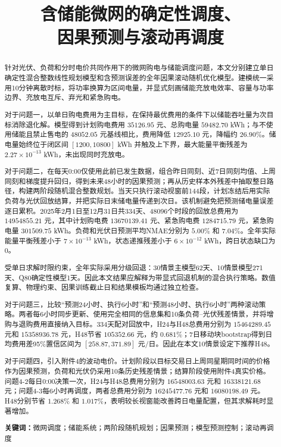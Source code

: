 \documentclass[UTF8,12pt,a4paper]{ctexart}
\title{\textbf{含储能微网的确定性调度、\\因果预测与滚动再调度}}
\author{}
\date{}
\newcommand{\keywords}[1]{\par\noindent\textbf{关键词：}#1}
\begin{document}
\pagestyle{plain}
\setcounter{page}{1}
\maketitle

\begin{abstract}
针对光伏、负荷和分时电价共同作用下的微网购电与储能调度问题，本文分别建立单日确定性混合整数线性规划模型和含预测误差的全年因果滚动随机优化模型。建模统一采用10分钟离散时标，将功率换算为区间电量，并显式刻画储能充放电效率、容量与功率边界、充放电互斥、弃光和紧急购电。

对于问题一，以单日购电费用为主目标，在保持最优费用的条件下以储能吞吐量为次目标消除退化解。模型得到计划购电费用 $35126.95$ 元、总购电量 $59482.70$ kWh；与不使用储能且禁止售电的 $48052.05$ 元基线相比，费用降低 $12925.10$ 元，降幅约 $26.90\%$。储电量始终位于闭区间 $[1200,10800]$ kWh 并触及上下界，最大能量平衡残差为 $2.27\times10^{-13}$ kWh，未出现同时充放电。

对于问题二，在每天0:00仅使用此前已发生数据，组合昨日同刻、近7日同刻均值、上周同刻和梯度提升回归，得到未来48小时的因果预测；再从历史样本外残差中抽取整日路径，构建两阶段随机混合整数规划。当天只执行滚动视窗前144段，计划冻结后用实际负荷与光伏回放结算，并把实际日末储电量传递到次日。该机制避免把预测储电量误差逐日累积。2025年2月1日至12月31日共334天、48096个时段的回放总费用为 $14954855.21$ 元，其中计划购电费 $13670139.41$ 元、紧急购电费 $1284715.79$ 元，紧急购电量 $301509.75$ kWh。负荷和光伏日预测平均NMAE分别为 $5.00\%$ 和 $7.04\%$。全年实际能量平衡残差小于 $7\times10^{-13}$ kWh，状态递推残差小于 $6\times10^{-12}$ kWh，跨日状态缺口为0。

受单日求解时限约束，全年实际采用分级回退：30情景主模型62天、10情景模型271天、Q80确定性模型1天。因此本文结果应解释为带显式回退机制的混合执行策略。数值复算、物理约束、因果训练截止日和结果模板均通过独立检查。

对于问题三，比较“预测24小时、执行6小时”和“预测48小时、执行6小时”两种滚动策略。两者每6小时同步更新、使用完全相同的信息集和10条负荷--光伏残差情景，并将增购与退购费用直接纳入目标。334天配对回放中，H24与H48总费用分别为 $15464289.45$ 元和 $15358936.78$ 元，H48节省 $105352.66$ 元，约 $0.681\%$；7日移动块bootstrap得到日均费用差95\%置信区间为 $[258.87,371.89]$ 元/日。因此在本文10情景设定下推荐H48。

对于问题四，引入附件4的波动电价。计划阶段以目标交易日上周同星期同时间的价格作为因果预测，负荷和光伏仍采用10条历史残差情景；结算阶段使用附件4真实价格。问题4-2每日0:00决策一次，H24与H48总费用分别为 $16548003.63$ 元和 $16338121.68$ 元；问题4-3每6小时再调度，两者总费用分别为 $16245477.76$ 元和 $16080198.49$ 元。H48分别节省 $1.268\%$ 和 $1.017\%$，表明较长视窗能改善跨日电量配置，但其求解耗时显著增加。

\keywords{微网调度；储能系统；两阶段随机规划；因果预测；模型预测控制；滚动再调度}
\end{abstract}
\end{document}

